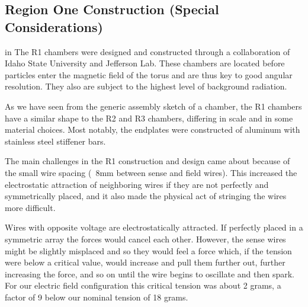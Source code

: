 \subsection{Region One Construction (Special Considerations)}

 in 
The R1 chambers were designed and constructed through a collaboration 
of Idaho State University and Jefferson Lab.  These 
chambers are located before particles enter the magnetic field of the torus
and are thus key to good angular resolution.  They also are subject to the
highest level of background radiation. 

As we have seen from the generic assembly sketch of a chamber, the R1
chambers have a similar shape to the R2 and R3 chambers, differing in
scale and in some material choices.
Most notably, the endplates were constructed of aluminum with stainless
steel stiffener bars.

The main challenges in the R1 construction and design came about because
of the small wire spacing (~8mm between sense and field wires).  This
increased the electrostatic attraction of neighboring wires if they are
not perfectly and symmetrically placed, and it also made the physical act
of stringing the wires more difficult.

Wires with opposite voltage are electrostatically attracted.  If perfectly
placed in a symmetric array the forces would cancel each other. 
However, the sense wires might be slightly misplaced and so they would feel
a force which, if the tension were below a critical value, would increase
and pull them further out, further increasing the force, and so on until 
the wire begins to oscillate and then spark.  For our electric field configuration
this critical tension was about 2 grams, a factor of 9 below our nominal
tension of 18 grams.

